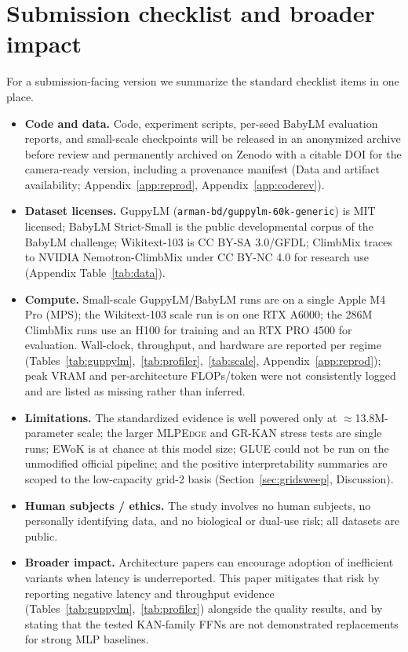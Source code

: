 \documentclass[11pt]{article}
\newcommand{\modelname}[1]{\textsc{#1}}
\newcommand{\grkan}{\modelname{GR-KAN}}
\newcommand{\mlpedge}{\modelname{MLPEdge}}
\begin{document}
\section{Submission checklist and broader impact}

For a submission-facing version we summarize the standard checklist items in one place.

\begin{itemize}
\item \textbf{Code and data.} Code, experiment scripts, per-seed BabyLM evaluation reports, and small-scale checkpoints will be released in an anonymized archive before review and permanently archived on Zenodo with a citable DOI for the camera-ready version, including a provenance manifest (Data and artifact availability; Appendix~\ref{app:reprod}, Appendix~\ref{app:coderev}).
\item \textbf{Dataset licenses.} GuppyLM (\texttt{arman-bd/guppylm-60k-generic}) is MIT licensed; BabyLM Strict-Small is the public developmental corpus of the BabyLM challenge; Wikitext-103 is CC BY-SA 3.0/GFDL; ClimbMix traces to NVIDIA Nemotron-ClimbMix under CC BY-NC 4.0 for research use (Appendix Table~\ref{tab:data}).
\item \textbf{Compute.} Small-scale GuppyLM/BabyLM runs are on a single Apple M4 Pro (MPS); the Wikitext-103 scale run is on one RTX A6000; the 286M ClimbMix runs use an H100 for training and an RTX PRO 4500 for evaluation. Wall-clock, throughput, and hardware are reported per regime (Tables~\ref{tab:guppylm},~\ref{tab:profiler},~\ref{tab:scale}, Appendix~\ref{app:reprod}); peak VRAM and per-architecture FLOPs/token were not consistently logged and are listed as missing rather than inferred.
\item \textbf{Limitations.} The standardized evidence is well powered only at \(\approx\)13.8M-parameter scale; the larger \mlpedge{} and \grkan{} stress tests are single runs; EWoK is at chance at this model size; GLUE could not be run on the unmodified official pipeline; and the positive interpretability summaries are scoped to the low-capacity grid-2 basis (Section~\ref{sec:gridsweep}, Discussion).
\item \textbf{Human subjects / ethics.} The study involves no human subjects, no personally identifying data, and no biological or dual-use risk; all datasets are public.
\item \textbf{Broader impact.} Architecture papers can encourage adoption of inefficient variants when latency is underreported. This paper mitigates that risk by reporting negative latency and throughput evidence (Tables~\ref{tab:guppylm},~\ref{tab:profiler}) alongside the quality results, and by stating that the tested KAN-family FFNs are not demonstrated replacements for strong MLP baselines.
\end{itemize}
\end{document}
